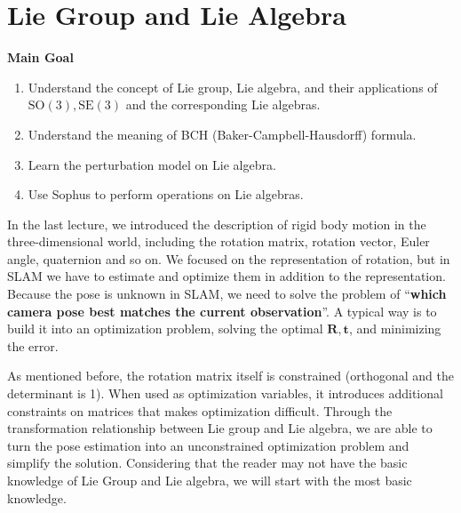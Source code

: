\chapter{Lie Group and Lie Algebra}
\label{cpt:4}
\begin{mdframed}
    \textbf{Main Goal}
    \begin{enumerate}
        \item Understand the concept of Lie group, Lie algebra, and their applications of $ \mathrm{SO}( 3 ), \mathrm{SE}( 3 ) $ and the corresponding Lie algebras.
        \item Understand the meaning of BCH (Baker-Campbell-Hausdorff) formula.
        \item Learn the perturbation model on Lie algebra.
        \item Use Sophus to perform operations on Lie algebras.
    \end{enumerate}
\end{mdframed}

In the last lecture, we introduced the description of rigid body motion in the three-dimensional world, including the rotation matrix, rotation vector, Euler angle, quaternion and so on. We focused on the representation of rotation, but in SLAM we have to estimate and optimize them in addition to the representation. Because the pose is unknown in SLAM, we need to solve the problem of ``\textbf {which camera pose best matches the current observation}''. A typical way is to build it into an optimization problem, solving the optimal $ \mathbf{R}, \mathbf{t}$, and minimizing the error.

As mentioned before, the rotation matrix itself is constrained (orthogonal and the determinant is 1). When used as optimization variables, it introduces additional constraints on matrices that makes optimization difficult. Through the transformation relationship between Lie group and Lie algebra, we are able to turn the pose estimation into an unconstrained optimization problem and simplify the solution. Considering that the reader may not have the basic knowledge of Lie Group and Lie algebra, we will start with the most basic knowledge.

\newpage
